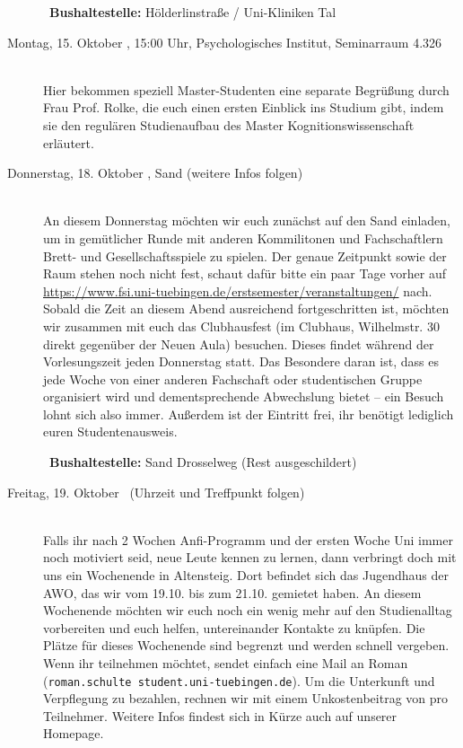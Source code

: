\begin{description}
~\textbf{Bushaltestelle:} Hölderlinstraße / Uni-Kliniken Tal
\fi

\ifkogwiss
\ifmaster
\item[Montag, 15. Oktober \YEAR, 15:00 Uhr, Psychologisches Institut, Seminarraum 4.326 ]\ \\
Hier bekommen speziell Master-Studenten eine separate Begrüßung durch Frau Prof. Rolke, die euch einen ersten Einblick ins Studium gibt, indem sie den regulären Studienaufbau des Master Kognitionswissenschaft erläutert. %
\fi
\fi


\item[Donnerstag, 18. Oktober \YEAR,  Sand (weitere Infos folgen)]\ \\
An diesem Donnerstag möchten wir euch zunächst auf den Sand einladen, um in gemütlicher Runde mit anderen Kommilitonen und Fachschaftlern Brett- und Gesellschaftsspiele zu spielen. Der genaue Zeitpunkt sowie der Raum stehen noch nicht fest, schaut dafür bitte ein paar Tage vorher auf \url{https://www.fsi.uni-tuebingen.de/erstsemester/veranstaltungen/} nach.\\ Sobald die Zeit an diesem Abend ausreichend fortgeschritten ist, möchten wir zusammen mit euch das Clubhausfest (im Clubhaus, Wilhelmstr. 30 direkt gegenüber der Neuen Aula) besuchen. Dieses findet während der Vorlesungszeit jeden Donnerstag statt. Das Besondere daran ist, dass es jede Woche von einer anderen Fachschaft oder studentischen Gruppe organisiert wird und dementsprechende Abwechslung bietet -- ein Besuch lohnt sich also immer. Außerdem ist der Eintritt frei, ihr benötigt lediglich euren Studentenausweis.

~\textbf{Bushaltestelle:} Sand Drosselweg (Rest ausgeschildert)

\item[Freitag, 19. Oktober \YEAR~(Uhrzeit und Treffpunkt folgen)]\ \\
Falls ihr nach 2 Wochen Anfi-Programm und der ersten Woche Uni immer noch motiviert seid, neue Leute kennen zu lernen, dann verbringt doch mit uns ein Wochenende in Altensteig. Dort befindet sich das Jugendhaus der AWO, das wir vom 19.10. bis zum 21.10. gemietet haben. An diesem Wochenende möchten wir euch noch ein wenig mehr auf den Studienalltag vorbereiten und euch helfen, untereinander Kontakte zu knüpfen. Die Plätze für dieses Wochenende sind begrenzt und werden schnell vergeben. Wenn ihr teilnehmen möchtet, sendet einfach eine Mail an Roman (\texttt{roman.schulte \At student.uni-tuebingen.de}). Um die Unterkunft und Verpflegung zu bezahlen, rechnen wir mit einem Unkostenbeitrag von  pro Teilnehmer. Weitere Infos findest sich in Kürze auch auf unserer Homepage.
\end{description}
